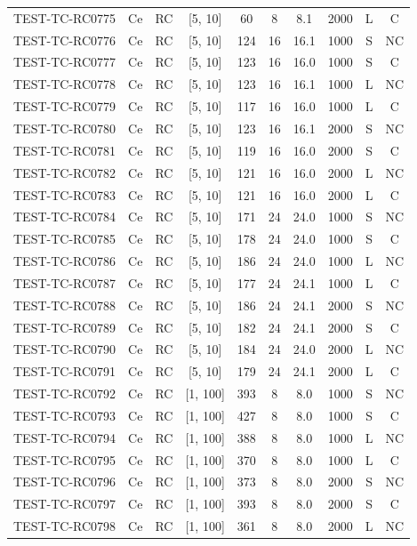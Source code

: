 \begin{longtable}{lccccccccc}
TEST-TC-RC0775 & Ce & RC & [5, 10] & 60 & 8 & 8.1 & 2000 & L & C \\
TEST-TC-RC0776 & Ce & RC & [5, 10] & 124 & 16 & 16.1 & 1000 & S & NC \\
TEST-TC-RC0777 & Ce & RC & [5, 10] & 123 & 16 & 16.0 & 1000 & S & C \\
TEST-TC-RC0778 & Ce & RC & [5, 10] & 123 & 16 & 16.1 & 1000 & L & NC \\
TEST-TC-RC0779 & Ce & RC & [5, 10] & 117 & 16 & 16.0 & 1000 & L & C \\
TEST-TC-RC0780 & Ce & RC & [5, 10] & 123 & 16 & 16.1 & 2000 & S & NC \\
TEST-TC-RC0781 & Ce & RC & [5, 10] & 119 & 16 & 16.0 & 2000 & S & C \\
TEST-TC-RC0782 & Ce & RC & [5, 10] & 121 & 16 & 16.0 & 2000 & L & NC \\
TEST-TC-RC0783 & Ce & RC & [5, 10] & 121 & 16 & 16.0 & 2000 & L & C \\
TEST-TC-RC0784 & Ce & RC & [5, 10] & 171 & 24 & 24.0 & 1000 & S & NC \\
TEST-TC-RC0785 & Ce & RC & [5, 10] & 178 & 24 & 24.0 & 1000 & S & C \\
TEST-TC-RC0786 & Ce & RC & [5, 10] & 186 & 24 & 24.0 & 1000 & L & NC \\
TEST-TC-RC0787 & Ce & RC & [5, 10] & 177 & 24 & 24.1 & 1000 & L & C \\
TEST-TC-RC0788 & Ce & RC & [5, 10] & 186 & 24 & 24.1 & 2000 & S & NC \\
TEST-TC-RC0789 & Ce & RC & [5, 10] & 182 & 24 & 24.1 & 2000 & S & C \\
TEST-TC-RC0790 & Ce & RC & [5, 10] & 184 & 24 & 24.0 & 2000 & L & NC \\
TEST-TC-RC0791 & Ce & RC & [5, 10] & 179 & 24 & 24.1 & 2000 & L & C \\
TEST-TC-RC0792 & Ce & RC & [1, 100] & 393 & 8 & 8.0 & 1000 & S & NC \\
TEST-TC-RC0793 & Ce & RC & [1, 100] & 427 & 8 & 8.0 & 1000 & S & C \\
TEST-TC-RC0794 & Ce & RC & [1, 100] & 388 & 8 & 8.0 & 1000 & L & NC \\
TEST-TC-RC0795 & Ce & RC & [1, 100] & 370 & 8 & 8.0 & 1000 & L & C \\
TEST-TC-RC0796 & Ce & RC & [1, 100] & 373 & 8 & 8.0 & 2000 & S & NC \\
TEST-TC-RC0797 & Ce & RC & [1, 100] & 393 & 8 & 8.0 & 2000 & S & C \\
TEST-TC-RC0798 & Ce & RC & [1, 100] & 361 & 8 & 8.0 & 2000 & L & NC \\

\end{longtable}
